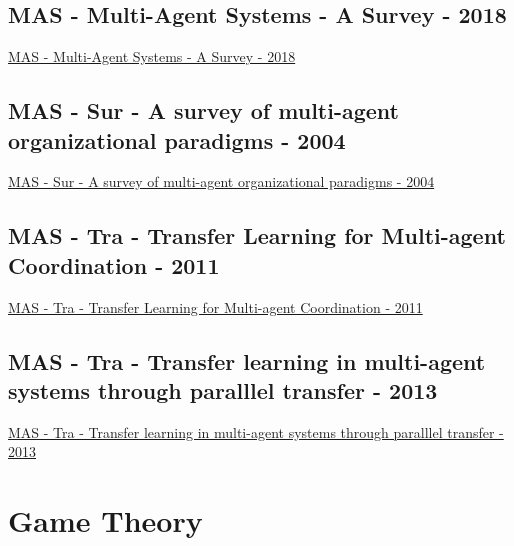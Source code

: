 \subsection{MAS - Multi-Agent Systems - A Survey - 2018}
\href{https://ieeexplore.ieee.org/abstract/document/8352646}{MAS - Multi-Agent Systems - A Survey - 2018}

\subsection{MAS - Sur - A survey of multi-agent organizational paradigms - 2004}
\href{https://dl.acm.org/doi/abs/10.1017/S0269888905000317}{MAS - Sur - A survey of multi-agent organizational paradigms - 2004}

\subsection{MAS - Tra - Transfer Learning for Multi-agent Coordination - 2011}
\href{https://www.scitepress.org/Papers/2011/31856/}{MAS - Tra - Transfer Learning for Multi-agent Coordination - 2011}

\subsection{MAS - Tra - Transfer learning in multi-agent systems through paralllel transfer - 2013}
\href{https://ulir.ul.ie/handle/10344/3305}{MAS - Tra - Transfer learning in multi-agent systems through paralllel transfer - 2013}

\section{Game Theory}
